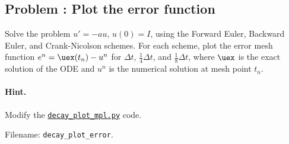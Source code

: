 \documentclass[graybox,sectrefs,envcountresetchap,open=right,final]{svmonodo}
\newenvironment{doconceexercise}{}{}
\newcounter{doconceexercisecounter}
\begin{document}
\begin{doconceexercise}

\subsection*{Problem \thedoconceexercisecounter: Plot the error function}

\label{decay:exer:plot:error}

Solve the problem $u'=-au$, $u(0)=I$, using the Forward Euler, Backward
Euler, and Crank-Nicolson schemes. For each scheme, plot the error mesh
function $e^n = \uex(t_n)-u^n$ for $\Delta t$, $\frac{1}{4}\Delta t$, and
$\frac{1}{8}\Delta t$, where $\uex$ is the exact solution of the ODE and
$u^n$ is the numerical solution at mesh point $t_n$.


\paragraph{Hint.}
Modify the \href{{http://tinyurl.com/ofkw6kc/alg/decay_plot_mpl.py}}{\nolinkurl{decay_plot_mpl.py}} code.



\noindent Filename: \Verb!decay_plot_error!.

\end{doconceexercise}
\end{document}
